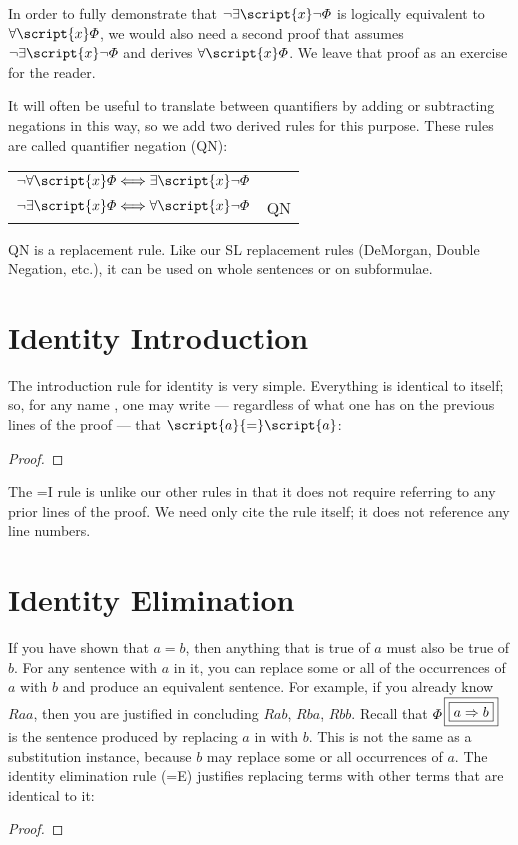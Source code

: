 In order to fully demonstrate that $\enot\exists \script{x}\enot\metaA{}$ is logically equivalent to $\forall \script{x}\metaA{}$, we would also need a second proof that assumes $\enot\exists \script{x}\enot\metaA{}$ and derives $\forall \script{x}\metaA{}$. We leave that proof as an exercise for the reader.

It will often be useful to translate between quantifiers by adding or subtracting negations in this way, so we add two derived rules for this purpose. These rules are called quantifier negation (QN):
\begin{center}
\begin{tabular}{rl}
$\enot\forall\script{x}\metaA{} \Longleftrightarrow \exists\script{x}\enot\metaA{}$\\
$\enot\exists\script{x}\metaA{} \Longleftrightarrow \forall\script{x}\enot\metaA{}$
& QN
\end{tabular}
\end{center}
QN is a replacement rule. Like our SL replacement rules (DeMorgan, Double Negation, etc.), it can be used on whole sentences or on subformulae.

\section{Identity Introduction}

The introduction rule for identity is very simple. Everything is identical to itself; so, for any name , one may write --- regardless of what one has on the previous lines of the proof --- that $\script{a}{=}\script{a}$:

\begin{proof}
	 
\end{proof}

The {=}I rule is unlike our other rules in that it does not require referring to any prior lines of the proof. We need only cite the rule itself; it does not reference any line numbers.

\section{Identity Elimination}

If you have shown that $a{=}b$, then anything that is true of $a$ must also be true of $b$. For any sentence with $a$ in it, you can replace some or all of the occurrences of $a$ with $b$ and produce an equivalent sentence. For example, if you already know $Raa$, then you are justified in concluding $Rab$, $Rba$, $Rbb$. Recall that $\metaA{}\substitutesome{a}{b}$ is the sentence produced by replacing $a$ in \metaA{} with $b$. This is not the same as a substitution instance, because $b$ may replace some or all occurrences of $a$. The identity elimination rule ({=}E) justifies replacing terms with other terms that are identical to it:
\begin{proof}
	 
	 
\end{proof}

